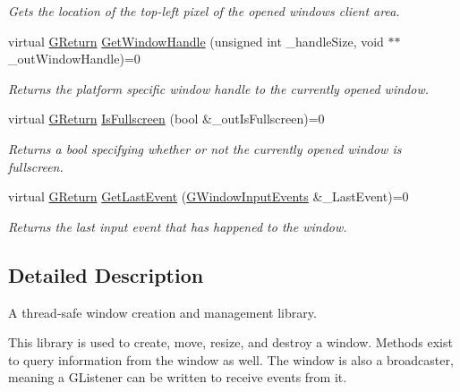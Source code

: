 \begin{DoxyCompactItemize}
\begin{DoxyCompactList}\small\item\em Gets the location of the top-\/left pixel of the opened window\textquotesingle{}s client area. \end{DoxyCompactList}\item 
virtual \mbox{\hyperlink{namespace_g_w_a67a839e3df7ea8a5c5686613a7a3de21}{G\+Return}} \mbox{\hyperlink{class_g_w_1_1_s_y_s_t_e_m_1_1_g_window_a71b73cc2ba9b010745f0f6171dc8b950}{Get\+Window\+Handle}} (unsigned int \+\_\+handle\+Size, void $\ast$$\ast$\+\_\+out\+Window\+Handle)=0
\begin{DoxyCompactList}\small\item\em Returns the platform specific window handle to the currently opened window. \end{DoxyCompactList}\item 
virtual \mbox{\hyperlink{namespace_g_w_a67a839e3df7ea8a5c5686613a7a3de21}{G\+Return}} \mbox{\hyperlink{class_g_w_1_1_s_y_s_t_e_m_1_1_g_window_a28ae1c50fbd7c1c292ed5aa055cae9a7}{Is\+Fullscreen}} (bool \&\+\_\+out\+Is\+Fullscreen)=0
\begin{DoxyCompactList}\small\item\em Returns a bool specifying whether or not the currently opened window is fullscreen. \end{DoxyCompactList}\item 
virtual \mbox{\hyperlink{namespace_g_w_a67a839e3df7ea8a5c5686613a7a3de21}{G\+Return}} \mbox{\hyperlink{class_g_w_1_1_s_y_s_t_e_m_1_1_g_window_ac5ce407834e1c92b5fe4ffded363ab00}{Get\+Last\+Event}} (\mbox{\hyperlink{namespace_g_w_1_1_s_y_s_t_e_m_a7d3a00c7f94541cb6f446fde944ab309}{G\+Window\+Input\+Events}} \&\+\_\+\+Last\+Event)=0
\begin{DoxyCompactList}\small\item\em Returns the last input event that has happened to the window. \end{DoxyCompactList}\end{DoxyCompactItemize}


\subsection{Detailed Description}
A thread-\/safe window creation and management library. 

This library is used to create, move, resize, and destroy a window. Methods exist to query information from the window as well. The window is also a broadcaster, meaning a G\+Listener can be written to receive events from it. 

